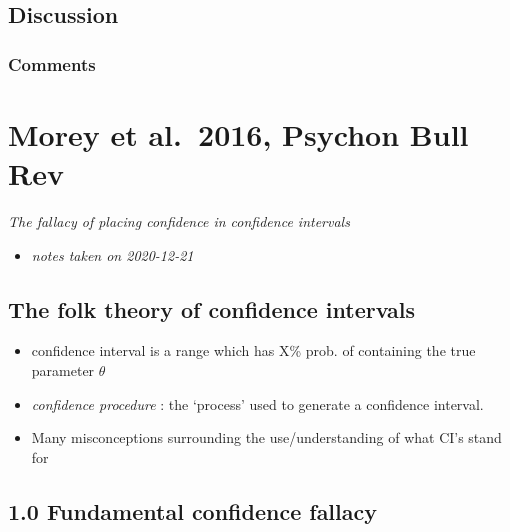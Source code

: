 \documentclass[
]{book}
\providecommand{\tightlist}{%
  \setlength{\itemsep}{0pt}\setlength{\parskip}{0pt}}
\begin{document}
\hypertarget{discussion-7}{%
\section{Discussion}\label{discussion-7}}

\hypertarget{comments-12}{%
\subsection{Comments}\label{comments-12}}

\hypertarget{morey-et-al.-2016-psychon-bull-rev}{%
\chapter{Morey et al.~2016, Psychon Bull Rev}\label{morey-et-al.-2016-psychon-bull-rev}}


\emph{The fallacy of placing confidence in confidence intervals} \citep{morey2016fallacy}

\begin{itemize}
\tightlist
\item
  \emph{notes taken on 2020-12-21}
\end{itemize}

\hypertarget{the-folk-theory-of-confidence-intervals}{%
\section{The folk theory of confidence intervals}\label{the-folk-theory-of-confidence-intervals}}

\begin{itemize}
\tightlist
\item
  confidence interval is a range which has X\% prob. of containing the true parameter \(\theta\)
\item
  \emph{confidence procedure} : the `process' used to generate a confidence interval.
\item
  Many misconceptions surrounding the use/understanding of what CI's stand for
\end{itemize}

\hypertarget{fundamental-confidence-fallacy}{%
\section{1.0 Fundamental confidence fallacy}\label{fundamental-confidence-fallacy}}
\end{document}
